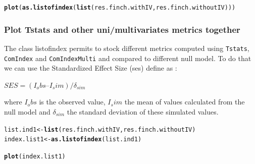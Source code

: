 \documentclass[12pt]{article}\usepackage[]{graphicx}\usepackage[]{color}
\makeatletter
\newcommand{\hlstd}[1]{\textcolor[rgb]{0.345,0.345,0.345}{#1}}%
\newcommand{\hlkwb}[1]{\textcolor[rgb]{0.69,0.353,0.396}{#1}}%
\newcommand{\hlkwd}[1]{\textcolor[rgb]{0.737,0.353,0.396}{\textbf{#1}}}%
\newenvironment{kframe}{%
 \def\at@end@of@kframe{}%
 \ifinner\ifhmode%
  \def\at@end@of@kframe{\end{minipage}}%
  \begin{minipage}{\columnwidth}%
 \fi\fi%
 \def\FrameCommand##1{\hskip\@totalleftmargin \hskip-\fboxsep
 \colorbox{shadecolor}{##1}\hskip-\fboxsep
     \hskip-\linewidth \hskip-\@totalleftmargin \hskip\columnwidth}%
 \MakeFramed {\advance\hsize-\width
   \@totalleftmargin\z@ \linewidth\hsize
   \@setminipage}}%
 {\par\unskip\endMakeFramed%
 \at@end@of@kframe}
\newenvironment{knitrout}{}{} %
\makeatother
\begin{document}
\begin{knitrout}
\color{fgcolor}\begin{kframe}
\begin{alltt}
\hlkwd{plot}\hlstd{(}\hlkwd{as.listofindex}\hlstd{(}\hlkwd{list}\hlstd{(res.finch.withIV, res.finch.withoutIV)))}
\end{alltt}


{\ttfamily\noindent\bfseries\color{errorcolor}{\#\# Error: objet 'res.finch.withIV' introuvable}}\end{kframe}
\end{knitrout}

\subsubsection{Plot Tstats and other uni/multivariates metrics together}
The class listofindex permits to stock different metrics computed using \texttt{Tstats}, \texttt{ComIndex} and \texttt{ComIndexMulti} and compared to different null model. To do that we can use the Standardized Effect Size (ses) define as : 

\begin{center}
$SES = (I_obs – I_sim) / \delta_{sim}$
\end{center}

where $I_obs$ is the observed value, $I_sim$ the mean of values calculated from the null model and $\delta_{sim}$ the standard deviation of these simulated values.


\begin{knitrout}
\color{fgcolor}\begin{kframe}
\begin{alltt}
\hlstd{list.ind1}\hlkwb{<-}\hlkwd{list}\hlstd{(res.finch.withIV, res.finch.withoutIV)}
\hlstd{index.list1}\hlkwb{<-}\hlkwd{as.listofindex}\hlstd{(list.ind1)}

\hlkwd{plot}\hlstd{(index.list1)}
\end{alltt}
\end{kframe}
\end{knitrout}
\end{document}
